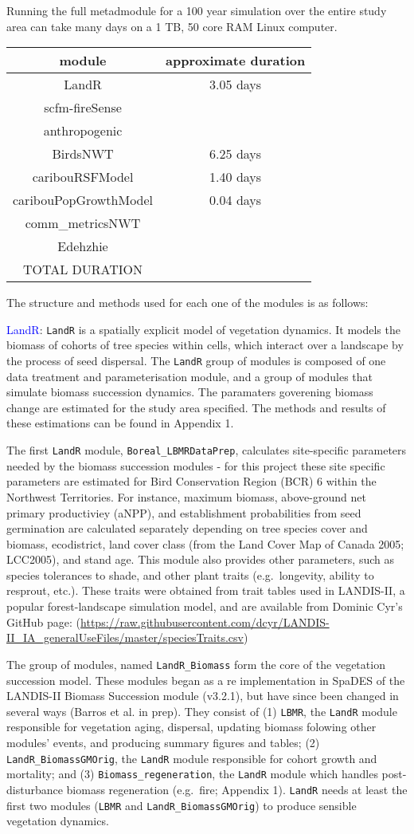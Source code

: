 \documentclass[]{article}
\begin{document}
Running the full metadmodule for a 100 year simulation over the entire
study area can take many days on a 1 TB, 50 core RAM Linux computer.

\begin{longtable}[]{@{}cc@{}}
\toprule
module & approximate duration\tabularnewline
\midrule
\endhead
LandR & 3.05 days\tabularnewline
scfm-fireSense &\tabularnewline
anthropogenic &\tabularnewline
BirdsNWT & 6.25 days\tabularnewline
caribouRSFModel & 1.40 days\tabularnewline
caribouPopGrowthModel & 0.04 days\tabularnewline
comm\_metricsNWT &\tabularnewline
Edehzhie &\tabularnewline
TOTAL DURATION &\tabularnewline
\bottomrule
\end{longtable}

The structure and methods used for each one of the modules is as
follows:

\textcolor{blue}{LandR}: \texttt{LandR} is a spatially explicit model of
vegetation dynamics. It models the biomass of cohorts of tree species
within cells, which interact over a landscape by the process of seed
dispersal. The \texttt{LandR} group of modules is composed of one data
treatment and parameterisation module, and a group of modules that
simulate biomass succession dynamics. The paramaters goverening biomass
change are estimated for the study area specified. The methods and
results of these estimations can be found in Appendix 1.

The first \texttt{LandR} module, \texttt{Boreal\_LBMRDataPrep},
calculates site-specific parameters needed by the biomass succession
modules - for this project these site specific parameters are estimated
for Bird Conservation Region (BCR) 6 within the Northwest Territories.
For instance, maximum biomass, above-ground net primary productiviey
(aNPP), and establishment probabilities from seed germination are
calculated separately depending on tree species cover and biomass,
ecodistrict, land cover class (from the Land Cover Map of Canada 2005;
LCC2005), and stand age. This module also provides other parameters,
such as species tolerances to shade, and other plant traits
(e.g.~longevity, ability to resprout, etc.). These traits were obtained
from trait tables used in LANDIS-II, a popular forest-landscape
simulation model, and are available from Dominic Cyr's GitHub page:
(\url{https://raw.githubusercontent.com/dcyr/LANDIS-II_IA_generalUseFiles/master/speciesTraits.csv})

The group of modules, named \texttt{LandR\_Biomass} form the core of the
vegetation succession model. These modules began as a re implementation
in SpaDES of the LANDIS-II Biomass Succession module (v3.2.1), but have
since been changed in several ways (Barros et al. in prep). They consist
of (1) \texttt{LBMR}, the \texttt{LandR} module responsible for
vegetation aging, dispersal, updating biomass folowing other modules'
events, and producing summary figures and tables; (2)
\texttt{LandR\_BiomassGMOrig}, the \texttt{LandR} module responsible for
cohort growth and mortality; and (3) \texttt{Biomass\_regeneration}, the
\texttt{LandR} module which handles post-disturbance biomass
regeneration (e.g.~fire; Appendix 1). \texttt{LandR} needs at least the
first two modules (\texttt{LBMR} and \texttt{LandR\_BiomassGMOrig}) to
produce sensible vegetation dynamics.
\end{document}
